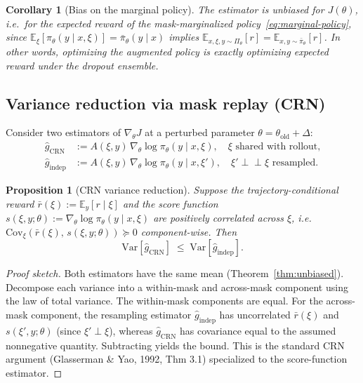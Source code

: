 \documentclass[11pt]{article}
\newtheorem{proposition}[theorem]{Proposition}
\newtheorem{corollary}[theorem]{Corollary}
\theoremstyle{definition}
\theoremstyle{remark}
\newcommand{\E}{\mathbb{E}}
\newcommand{\Var}{\mathrm{Var}}
\newcommand{\Cov}{\mathrm{Cov}}
\newcommand{\old}{\mathrm{old}}
\begin{document}
\begin{corollary}[Bias on the marginal policy]
The estimator is unbiased for $J(\theta)$, i.e.\ for the expected reward of
the mask-marginalized policy~\eqref{eq:marginal-policy}, since
$\E_\xi[\pi_\theta(y\mid x,\xi)] = \bar\pi_\theta(y\mid x)$ implies
$\E_{x,\xi,y\sim\Pi_\theta}[r] = \E_{x,y\sim\bar\pi_\theta}[r]$.  In other
words, optimizing the augmented policy is exactly optimizing expected reward
under the dropout ensemble.
\end{corollary}

\subsection{Variance reduction via mask replay (CRN)}

Consider two estimators of $\nabla_\theta J$ at a perturbed parameter
$\theta = \theta_\old + \Delta$:
\begin{align}
\hat g_{\mathrm{CRN}} &:=
   A(\xi, y)\,\nabla_\theta \log \pi_\theta(y\mid x, \xi),
   \quad \xi\text{ shared with rollout,}
\\
\hat g_{\mathrm{indep}} &:=
   A(\xi, y)\,\nabla_\theta \log \pi_\theta(y\mid x, \xi'),
   \quad \xi' \perp\!\!\!\perp \xi\text{ resampled.}
\end{align}

\begin{proposition}[CRN variance reduction]
\label{prop:crn}
Suppose the trajectory-conditional reward $\bar r(\xi) := \E_y[r \mid \xi]$ and
the score function $s(\xi, y; \theta) := \nabla_\theta \log\pi_\theta(y\mid x,\xi)$
are positively correlated across $\xi$, i.e.\
$\Cov_\xi(\bar r(\xi),\,s(\xi,y;\theta)) \succeq 0$ component-wise.  Then
\begin{equation}
\Var[\hat g_{\mathrm{CRN}}] \;\le\; \Var[\hat g_{\mathrm{indep}}].
\end{equation}
\end{proposition}

\begin{proof}[Proof sketch]
Both estimators have the same mean (Theorem~\ref{thm:unbiased}).  Decompose
each variance into a within-mask and across-mask component using the law of
total variance.  The within-mask components are equal.  For the across-mask
component, the resampling estimator $\hat g_{\mathrm{indep}}$ has uncorrelated
$\bar r(\xi)$ and $s(\xi',y;\theta)$ (since $\xi'\perp\xi$), whereas
$\hat g_{\mathrm{CRN}}$ has covariance equal to the assumed nonnegative
quantity.  Subtracting yields the bound.  This is the standard CRN argument
(Glasserman \& Yao, 1992, Thm 3.1) specialized to the score-function
estimator.
\end{proof}
\end{document}
